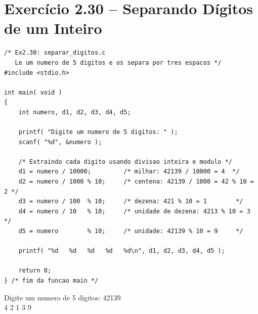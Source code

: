 \documentclass[12pt,a4paper]{article}
\begin{document}
\section{Exercício 2.30 -- Separando Dígitos de um Inteiro}

\begin{respostabox}[title={Exercício 2.30 -- Separar dígitos de número de 5 dígitos}]
\begin{lstlisting}
/* Ex2.30: separar_digitos.c
   Le um numero de 5 digitos e os separa por tres espacos */
#include <stdio.h>

int main( void )
{
    int numero, d1, d2, d3, d4, d5;

    printf( "Digite um numero de 5 digitos: " );
    scanf( "%d", &numero );

    /* Extraindo cada digito usando divisao inteira e modulo */
    d1 = numero / 10000;         /* milhar: 42139 / 10000 = 4  */
    d2 = numero / 1000 % 10;     /* centena: 42139 / 1000 = 42 % 10 = 2 */
    d3 = numero / 100  % 10;     /* dezena: 421 % 10 = 1        */
    d4 = numero / 10   % 10;     /* unidade de dezena: 4213 % 10 = 3 */
    d5 = numero        % 10;     /* unidade: 42139 % 10 = 9     */

    printf( "%d   %d   %d   %d   %d\n", d1, d2, d3, d4, d5 );

    return 0;
} /* fim da funcao main */
\end{lstlisting}

\begin{saida}
Digite um numero de 5 digitos: 42139\\
4   2   1   3   9
\end{saida}
\end{respostabox}
\end{document}
